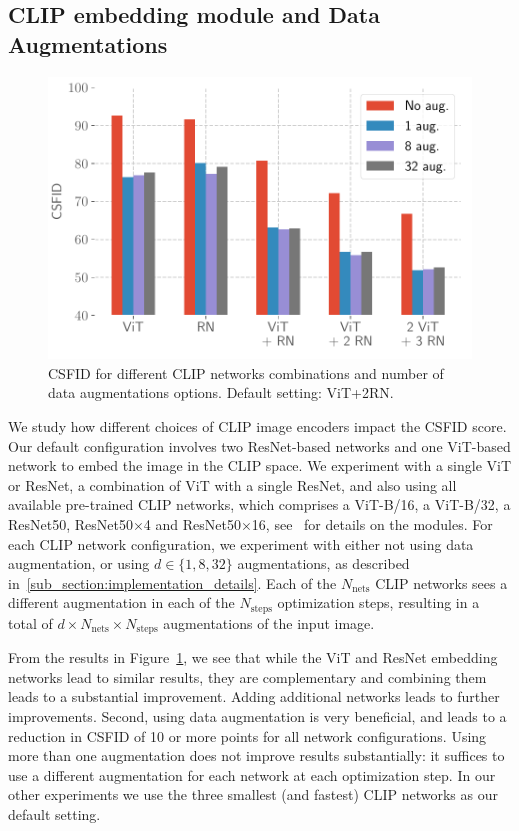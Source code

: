 \subsection{CLIP embedding module and Data Augmentations} 

\begin{figure}[H]
    \centering
    \vspace{-1em}
    \includegraphics[width=.9\linewidth]{images/flexit/assets/naug_nnets.pdf}
    \caption{CSFID for different CLIP networks combinations and number of data augmentations options. Default setting: ViT+2RN.}
\label{fig:augs}
\end{figure}



We study how different choices of \ac{CLIP} image encoders impact the \ac{CSFID} score. 
Our default configuration involves two ResNet-based networks and one ViT-based network 
to embed the image in the \ac{CLIP} space. 
We experiment with a single ViT or ResNet, a combination of ViT with a single  ResNet,  
and also using all available pre-trained \ac{CLIP} networks, which comprises a ViT-B/16, a
 ViT-B/32, a ResNet50, ResNet50$\times$4 and ResNet50$\times$16,
  see~\citep{radford2021learning} for details on the modules.
For each \ac{CLIP} network configuration, we experiment with  either  not using data 
augmentation, or using $d \in\{ 1, 8, 32\}$ augmentations, as described in~\ref{sub_section:implementation_details}.
Each of the $N_\textrm{nets}$ \ac{CLIP} networks sees a different augmentation in each of 
the $N_\textrm{steps}$ optimization steps,  resulting in a total of
 $d \times N_\textrm{nets} \times N_\textrm{steps}$ augmentations of the input image.

From the results in Figure~\ref{fig:augs}, we see that while the  ViT and  ResNet 
embedding networks lead to similar results, they are complementary and combining them 
leads to a substantial improvement.  
Adding additional networks leads to further improvements.
%
Second, using data augmentation is very beneficial, and leads to a reduction in \ac{CSFID} 
of 10 or more points for all network configurations. 
Using more than one augmentation does not improve results substantially: it suffices 
to use a different augmentation for each network at each optimization step.
In our other experiments we use the three smallest (and fastest) \ac{CLIP} networks as our 
default setting.





